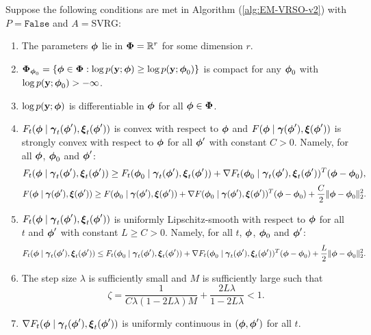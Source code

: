 \begin{theorem}

    Suppose the following conditions are met in Algorithm (\ref{alg:EM-VRSO-v2}) with $P = \texttt{False}$ and $A = \text{SVRG}$:
    
    \begin{enumerate}
        \item The parameters $\boldsymbol{\phi}$ lie in $\boldsymbol{\Phi} = \mathbb{R}^r$ for some dimension $r$.
        \item $\boldsymbol{\Phi}_{\boldsymbol{\phi}_0} = \{\boldsymbol{\phi} \in \boldsymbol{\Phi}: \log p(\mathbf{y};\boldsymbol{\phi}) \geq \log p(\mathbf{y};\boldsymbol{\phi}_0)\}$ is compact for any  $\boldsymbol{\phi}_0$ with $\log p(\mathbf{y};\boldsymbol{\phi}_0) > -\infty$.
        \item $\log p(\mathbf{y};\boldsymbol{\phi})$ is differentiable in $\boldsymbol{\phi}$ for all $\boldsymbol{\phi} \in \boldsymbol{\Phi}$.
        \item $F_t(\boldsymbol{\phi} \mid \boldsymbol{\gamma}_t(\boldsymbol{\phi}'), \boldsymbol{\xi}_t(\boldsymbol{\phi}'))$ is convex with respect to $\boldsymbol{\phi}$ and $F(\boldsymbol{\phi} \mid \boldsymbol{\gamma}(\boldsymbol{\phi}'), \boldsymbol{\xi}(\boldsymbol{\phi}'))$ is strongly convex with respect to $\boldsymbol{\phi}$ for all $\boldsymbol{\phi}'$ with constant $C > 0$. Namely, for all $\boldsymbol{\phi}$, $\boldsymbol{\phi}_0$ and $\boldsymbol{\phi}'$:
        \begin{equation}
            F_t(\boldsymbol{\phi} \mid \boldsymbol{\gamma}_t(\boldsymbol{\phi}'), \boldsymbol{\xi}_t(\boldsymbol{\phi}')) \geq F_t(\boldsymbol{\phi}_0 \mid \boldsymbol{\gamma}_t(\boldsymbol{\phi}'), \boldsymbol{\xi}_t(\boldsymbol{\phi}')) + \nabla F_t(\boldsymbol{\phi}_0 \mid \boldsymbol{\gamma}_t(\boldsymbol{\phi}'), \boldsymbol{\xi}_t(\boldsymbol{\phi}'))^T(\boldsymbol{\phi}-\boldsymbol{\phi}_0),
        \end{equation}
        \begin{equation}
            F(\boldsymbol{\phi} \mid \boldsymbol{\gamma}(\boldsymbol{\phi}'), \boldsymbol{\xi}(\boldsymbol{\phi}')) \geq F(\boldsymbol{\phi}_0 \mid \boldsymbol{\gamma}(\boldsymbol{\phi}'), \boldsymbol{\xi}(\boldsymbol{\phi}')) + \nabla F(\boldsymbol{\phi}_0 \mid \boldsymbol{\gamma}(\boldsymbol{\phi}'), \boldsymbol{\xi}(\boldsymbol{\phi}'))^T(\boldsymbol{\phi}-\boldsymbol{\phi}_0) + \frac{C}{2} \|\boldsymbol{\phi} - \boldsymbol{\phi}_0\|_2^2.
        \end{equation}
        \item $F_t(\boldsymbol{\phi} \mid \boldsymbol{\gamma}_t(\boldsymbol{\phi}'), \boldsymbol{\xi}_t(\boldsymbol{\phi}'))$ is uniformly Lipschitz-smooth with respect to $\boldsymbol{\phi}$ for all $t$ and $\boldsymbol{\phi}'$ with constant $L \geq C > 0$. Namely, for all $t$, $\boldsymbol{\phi}$, $\boldsymbol{\phi}_0$ and $\boldsymbol{\phi}'$:
        \begin{equation}
            F_t(\boldsymbol{\phi} \mid \boldsymbol{\gamma}_t(\boldsymbol{\phi}'), \boldsymbol{\xi}_t(\boldsymbol{\phi}')) \leq F_t(\boldsymbol{\phi}_0 \mid \boldsymbol{\gamma}_t(\boldsymbol{\phi}'), \boldsymbol{\xi}_t(\boldsymbol{\phi}')) + \nabla F_t(\boldsymbol{\phi}_0 \mid \boldsymbol{\gamma}_t(\boldsymbol{\phi}'), \boldsymbol{\xi}_t(\boldsymbol{\phi}'))^T(\boldsymbol{\phi} - \boldsymbol{\phi}_0) + \frac{L}{2} \| \boldsymbol{\phi} - \boldsymbol{\phi}_0 \|_2^2.
        \end{equation}
        \item The step size $\lambda$ is sufficiently small and $M$ is sufficiently large such that
        \begin{equation}
            \zeta = \frac{1}{C \lambda(1-2L\lambda)M} + \frac{2L\lambda}{1-2L\lambda} < 1.
        \end{equation}
        \item $\nabla F_t(\boldsymbol{\phi} \mid \boldsymbol{\gamma}_t(\boldsymbol{\phi}'), \boldsymbol{\xi}_t(\boldsymbol{\phi}'))$ is uniformly continuous in $(\boldsymbol{\phi},\boldsymbol{\phi}')$ for all $t$.
    \end{enumerate}
    

\end{theorem}
